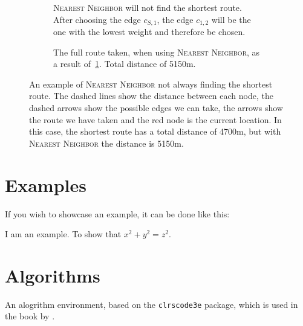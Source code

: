 \begin{figure}[htb!]
\begin{subfigure}[b]{0.45\textwidth}
    \caption{\textsc{Nearest Neighbor} will not find the shortest route.
    After choosing the edge $c_{S,1}$, the edge $c_{1,2}$ will be the one with the lowest weight and therefore be chosen.}
    \label{fig:nn-vs-optimal-3}
\end{subfigure}
\hfill
\begin{subfigure}[b]{0.45\textwidth}
    \caption{The full route taken, when using \textsc{Nearest Neighbor}, as a result of~\ref{fig:nn-vs-optimal-3}. Total distance of 5150m.}
    \label{fig:nn-vs-optimal-4}
\end{subfigure}
\caption{An example of \textsc{Nearest Neighbor} not always finding the shortest route.
The dashed lines show the distance between each node, the dashed arrows show the possible edges we can take, the arrows show the route we have taken and the red node is the current location.
In this case, the shortest route has a total distance of 4700m, but with \textsc{Nearest Neighbor} the distance is 5150m.}
\label{fig:nn-vs-optimal}
\end{figure}


\section{Examples}
If you wish to showcase an example, it can be done like this:

\begin{exa}
    I am an example. To show that $x^2 + y^2 = z^2$.
\end{exa}


\section{Algorithms}
An alogrithm environment, based on the \texttt{clrscode3e} package, which is used in the book  by \citeauthor{alg-book} \cite{alg-book}.


